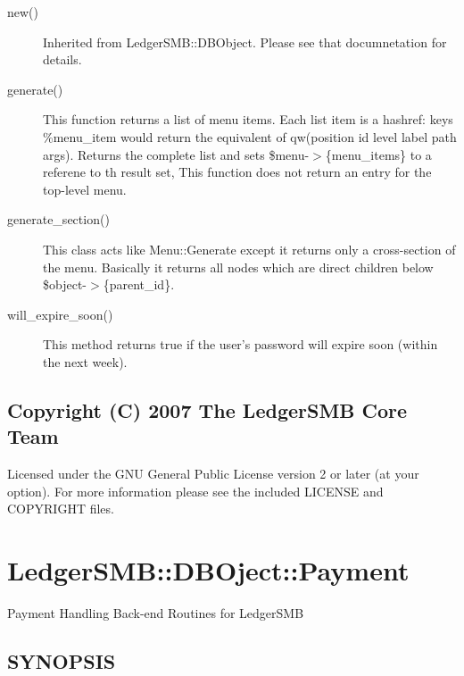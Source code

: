 \begin{description}
\begin{description}
\begin{description}
\begin{description}
\begin{description}
\begin{description}
\begin{description}
\begin{description}
\begin{description}
\begin{description}
\item[{new()}] \mbox{}

Inherited from LedgerSMB::DBObject.  Please see that documnetation for details.


\item[{generate()}] \mbox{}

This function returns a list of menu items.  Each list item is a hashref:
keys \%menu\_item would return the equivalent of qw(position id level label path 
args).  Returns the complete list and sets \$menu-$>$\{menu\_items\} to a referene to 
th result set, This function does not return an entry for the top-level menu.


\item[{generate\_section()}] \mbox{}

This class acts like Menu::Generate except it returns only a cross-section of 
the menu.  Basically it returns all nodes which are direct children below
\$object-$>$\{parent\_id\}.


\item[{will\_expire\_soon()}] \mbox{}

This method returns true if the user's password will expire soon 
(within the next week).

\end{description}
\subsection*{Copyright (C) 2007 The LedgerSMB Core Team\label{LedgerSMB::DBObject::Menu_Copyright_C_2007_The_LedgerSMB_Core_Team}}


Licensed under the GNU General Public License version 2 or later (at your 
option).  For more information please see the included LICENSE and COPYRIGHT 
files.

\section{LedgerSMB::DBOject::Payment\label{LedgerSMB::DBOject::Payment}}


Payment Handling Back-end Routines for LedgerSMB

\subsection*{SYNOPSIS\label{LedgerSMB::DBOject::Payment_SYNOPSIS}}



\end{description}
\end{description}
\end{description}
\end{description}
\end{description}
\end{description}
\end{description}
\end{description}
\end{description}
